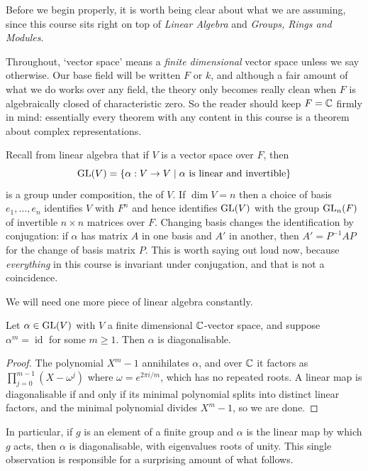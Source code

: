 \documentclass[a4paper]{scrartcl}
\newcommand{\id}{\operatorname{id}}
\begin{document}
Before we begin properly, it is worth being clear about what we are assuming, since this course sits right on top of \emph{Linear Algebra} and \emph{Groups, Rings and Modules}.

Throughout, `vector space' means a \emph{finite dimensional} vector space unless we say otherwise. Our base field will be written $F$ or $k$, and although a fair amount of what we do works over any field, the theory only becomes really clean when $F$ is algebraically closed of characteristic zero. So the reader should keep $F = \mathbb{C}$ firmly in mind: essentially every theorem with any content in this course is a theorem about complex representations.

Recall from linear algebra that if $V$ is a vector space over $F$, then
$$\operatorname{GL}(V) = \{ \alpha : V \to V \mid \alpha \text{ is linear and invertible}\}$$
is a group under composition, the  of $V$. If $\dim V = n$ then a choice of basis $e_1, \dots, e_n$ identifies $V$ with $F^n$ and hence identifies $\operatorname{GL}(V)$ with the group $\operatorname{GL}_n(F)$ of invertible $n \times n$ matrices over $F$. Changing basis changes the identification by conjugation: if $\alpha$ has matrix $A$ in one basis and $A'$ in another, then $A' = P^{-1} A P$ for the change of basis matrix $P$. This is worth saying out loud now, because \emph{everything} in this course is invariant under conjugation, and that is not a coincidence.

We will need one more piece of linear algebra constantly.

\begin{proposition}[Diagonalisability]
	Let $\alpha \in \operatorname{GL}(V)$ with $V$ a finite dimensional $\mathbb{C}$-vector space, and suppose $\alpha^m = \id$ for some $m \geq 1$. Then $\alpha$ is diagonalisable.
\end{proposition}
\begin{proof}
	The polynomial $X^m - 1$ annihilates $\alpha$, and over $\mathbb{C}$ it factors as $\prod_{j=0}^{m-1}(X - \omega^j)$ where $\omega = e^{2\pi i/m}$, which has no repeated roots. A linear map is diagonalisable if and only if its minimal polynomial splits into distinct linear factors, and the minimal polynomial divides $X^m - 1$, so we are done.
\end{proof}

In particular, if $g$ is an element of a finite group and $\alpha$ is the linear map by which $g$ acts, then $\alpha$ is diagonalisable, with eigenvalues roots of unity. This single observation is responsible for a surprising amount of what follows.
\end{document}
